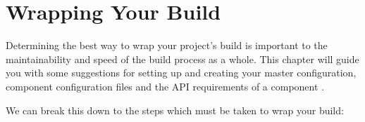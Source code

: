 %
%
%
%
\chapter{Wrapping Your Build}\label{chap:wrapping}

Determining the best way to wrap your project's build is important to
the maintainability and speed of the build process as a whole.  This
chapter will guide you with some suggestions for setting up and
creating your master configuration, component configuration files and
the API requirements of a component \makefile.

We can break this down to the steps which must be taken to wrap your
build:

